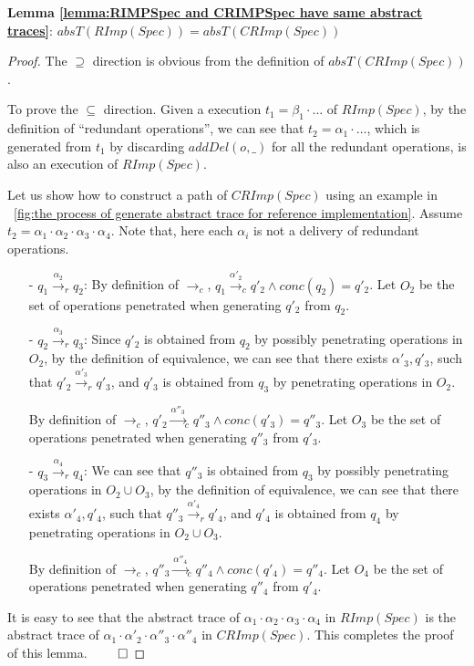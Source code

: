 {\noindent \bf Lemma \ref{lemma:RIMPSpec and CRIMPSpec have same abstract traces}}: $absT(RImp(Spec)) = absT(CRImp(Spec))$
\begin {proof}

The $\supseteq$ direction is obvious from the definition of $absT(CRImp(Spec))$.

To prove the $\subseteq$ direction. Given a execution $t_1 = \beta_1 \cdot \ldots$ of $RImp(Spec)$, by the definition of ``redundant operations'', we can see that $t_2 = \alpha_1 \cdot \ldots$, which is generated from $t_1$ by discarding $addDel(o,\_)$ for all the redundant operations, is also an execution of $RImp(Spec)$.

Let us show how to construct a path of $CRImp(Spec)$ using an example in \figurename~\ref{fig:the process of generate abstract trace for reference implementation}. Assume $t_2 = \alpha_1 \cdot \alpha_2 \cdot \alpha_3 \cdot \alpha_4$. Note that, here each $\alpha_i$ is not a delivery of redundant operations.

\begin{itemize}
\setlength{\itemsep}{0.5pt}
\item[-] $q_1 {\xrightarrow{\alpha_2}}_r q_2$: By definition of $\rightarrow_c$, $q_1 {\xrightarrow{\alpha'_2}}_c q'_2 \wedge conc(q_2)=q'_2$. Let $O_2$ be the set of operations penetrated when generating $q'_2$ from $q_2$.

\item[-] $q_2 {\xrightarrow{\alpha_3}}_r q_3$: Since $q'_2$ is obtained from $q_2$ by possibly penetrating operations in $O_2$, by the definition of equivalence, we can see that there exists $\alpha'_3, q'_3$, such that $q'_2 {\xrightarrow{\alpha'_3}}_r q'_3$, and $q'_3$ is obtained from $q_3$ by penetrating operations in $O_2$.

By definition of $\rightarrow_c$, $q'_2 {\xrightarrow{\alpha''_3}}_c q''_3 \wedge conc(q'_3)=q''_3$. Let $O_3$ be the set of operations penetrated when generating $q''_3$ from $q'_3$.

\item[-] $q_3 {\xrightarrow{\alpha_4}}_r q_4$: We can see that $q''_3$ is obtained from $q_3$ by possibly penetrating operations in $O_2 \cup O_3$, by the definition of equivalence, we can see that there exists $\alpha'_4, q'_4$, such that $q''_3 {\xrightarrow{\alpha'_4}}_r q'_4$, and $q'_4$ is obtained from $q_4$ by penetrating operations in $O_2 \cup O_3$.

By definition of $\rightarrow_c$, $q''_3 {\xrightarrow{\alpha''_4}}_c q''_4 \wedge conc(q'_4)=q''_4$. Let $O_4$ be the set of operations penetrated when generating $q''_4$ from $q'_4$.
\end{itemize}

It is easy to see that the abstract trace of $\alpha_1 \cdot \alpha_2 \cdot \alpha_3 \cdot \alpha_4$ in $RImp(Spec)$ is the abstract trace of $\alpha_1 \cdot \alpha'_2 \cdot \alpha''_3 \cdot \alpha''_4$ in $CRImp(Spec)$. This completes the proof of this lemma. $\qed$
\end {proof}
